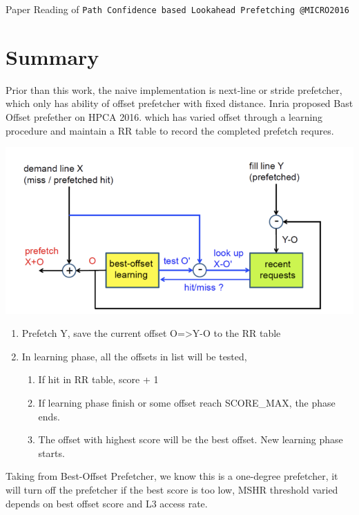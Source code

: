 \documentclass[letterpaper,12pt]{article}
\begin{document}
\begin{frame}[t]
  \huge{Paper Reading of \texttt{Path Confidence based Lookahead Prefetching @MICRO2016}\cite{kim2016path}}

  \bigskip
\end{frame}

\section{Summary}
Prior than this work, the naive implementation is next-line or stride prefetcher, which only has ability of offset prefetcher with fixed distance. Inria proposed Bast Offset prefether \cite{michaud2016best} on HPCA 2016. which has varied offset through a learning procedure and maintain a RR table to record the completed prefetch requres.\\
\begin{center}
  \includegraphics[width=\textwidth]{RRtable.png}
\end{center}
\begin{enumerate}
  \item Prefetch Y, save the current offset O=>Y-O to the RR table
  \item In learning phase, all the offsets in list will be tested,
        \begin{enumerate}
          \item If hit in RR table, score + 1
          \item If learning phase finish or some offset reach SCORE\_MAX, the phase ends.
          \item The offset with highest score will be the best offset. New learning phase starts.
        \end{enumerate}
\end{enumerate}
Taking from Best-Offset Prefetcher, we know this is a one-degree prefetcher, it will turn off the prefetcher if the best score is too low, MSHR threshold varied depends on best offset score and L3 access rate.
\end{document}
